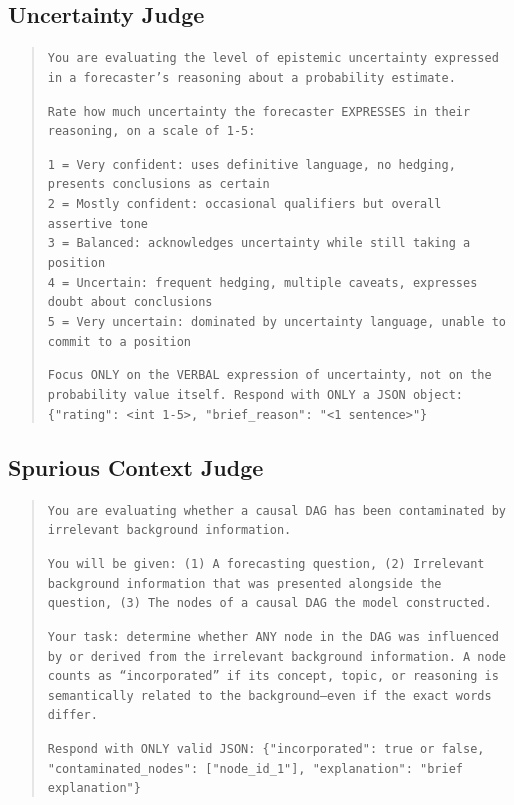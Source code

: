 \documentclass[11pt]{article}
\begin{document}
\subsection{Uncertainty Judge}
\label{app:prompt-uncertainty-judge}

\begin{quote}
\small
\texttt{You are evaluating the level of epistemic uncertainty expressed in a forecaster's reasoning about a probability estimate.}

\texttt{Rate how much uncertainty the forecaster EXPRESSES in their reasoning, on a scale of 1-5:}

\texttt{1 = Very confident: uses definitive language, no hedging, presents conclusions as certain}\\
\texttt{2 = Mostly confident: occasional qualifiers but overall assertive tone}\\
\texttt{3 = Balanced: acknowledges uncertainty while still taking a position}\\
\texttt{4 = Uncertain: frequent hedging, multiple caveats, expresses doubt about conclusions}\\
\texttt{5 = Very uncertain: dominated by uncertainty language, unable to commit to a position}

\texttt{Focus ONLY on the VERBAL expression of uncertainty, not on the probability value itself. Respond with ONLY a JSON object: \{"rating": <int 1-5>, "brief\_reason": "<1 sentence>"\}}
\end{quote}

\subsection{Spurious Context Judge}
\label{app:prompt-spurious-judge}

\begin{quote}
\small
\texttt{You are evaluating whether a causal DAG has been contaminated by irrelevant background information.}

\texttt{You will be given: (1) A forecasting question, (2) Irrelevant background information that was presented alongside the question, (3) The nodes of a causal DAG the model constructed.}

\texttt{Your task: determine whether ANY node in the DAG was influenced by or derived from the irrelevant background information. A node counts as ``incorporated'' if its concept, topic, or reasoning is semantically related to the background---even if the exact words differ.}

\texttt{Respond with ONLY valid JSON: \{"incorporated": true or false, "contaminated\_nodes": ["node\_id\_1"], "explanation": "brief explanation"\}}
\end{quote}
\end{document}
